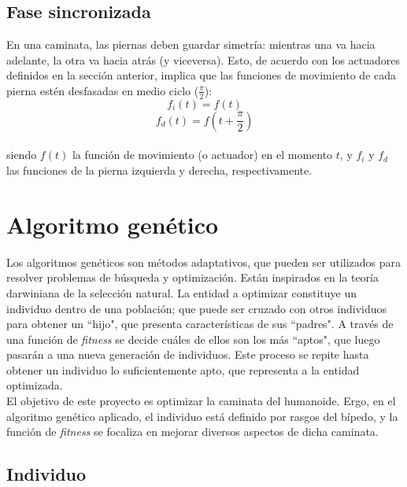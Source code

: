 \documentclass{article}
\begin{document}
\subsection{Fase sincronizada}
En una caminata, las piernas deben guardar simetr\'ia: mientras una va hacia adelante, la otra va hacia atr\'as (y viceversa). Esto, de acuerdo con  los actuadores definidos en la secci\'on anterior, implica que las funciones de movimiento de cada pierna est\'en desfasadas en medio ciclo ($\frac{\pi}{2}$):
\begin{equation}
f_{i}(t) =  f(t)
 \end{equation}
 \begin{equation}
f_{d}(t) =  f(t+\frac{\pi}{2})
 \end{equation}
 \\
siendo $f(t)$ la funci\'on de movimiento (o actuador) en el momento $t$, y $f_{i}$ y $f_{d}$ las funciones de la pierna izquierda y derecha, respectivamente.



\section{Algoritmo gen\'etico}

Los algoritmos gen\'eticos son m\'etodos adaptativos, que pueden ser utilizados para resolver problemas de b\'usqueda y optimizaci\'on. Est\'an inspirados en la teor\'ia darwiniana de la selecci\'on natural. La entidad a optimizar constituye un individuo dentro de una poblaci\'on; que puede ser cruzado con otros individuos para obtener un ``hijo", que presenta caracter\'isticas de sus ``padres". A trav\'es de una funci\'on de \textit{fitness} se decide cu\'ales de ellos son los m\'as ``aptos", que luego pasar\'an a una nueva generaci\'on de individuos. Este proceso se repite hasta obtener un individuo lo suficientemente apto, que representa a la entidad optimizada.\\
El objetivo de este proyecto es optimizar la caminata del humanoide. Ergo, en el algoritmo gen\'etico aplicado, el individuo est\'a definido por rasgos del b\'ipedo, y la funci\'on de \textit{fitness} se focaliza en mejorar diversos aspectos de dicha caminata.

\subsection{Individuo}
\end{document}
